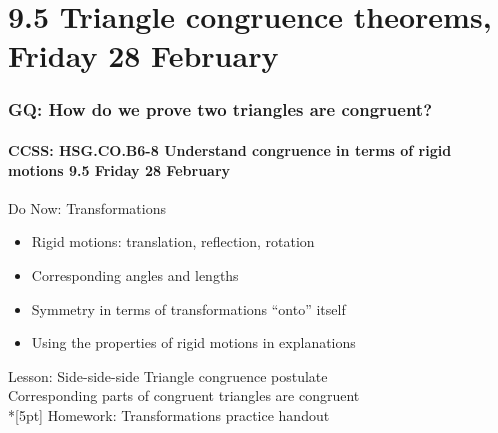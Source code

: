 \documentclass{beamer}
\begin{document}
\section{9.5 Triangle congruence theorems, Friday 28 February}
\frame
{
  \frametitle{GQ: How do we prove two triangles are congruent?}
  \framesubtitle{CCSS: HSG.CO.B6-8 Understand congruence in terms of rigid motions \hfill \alert{9.5 Friday 28 February}}

  \begin{block}{Do Now: Transformations}
    \begin{itemize}
      \item Rigid motions: translation, reflection, rotation
      \item Corresponding angles and lengths
      \item Symmetry in terms of transformations ``onto'' itself
      \item Using the properties of rigid motions in explanations
    \end{itemize}
    \end{block}
    Lesson: Side-side-side Triangle congruence postulate \\
    Corresponding parts of congruent triangles are congruent\\*[5pt]
    Homework: Transformations practice handout
}
\end{document}
